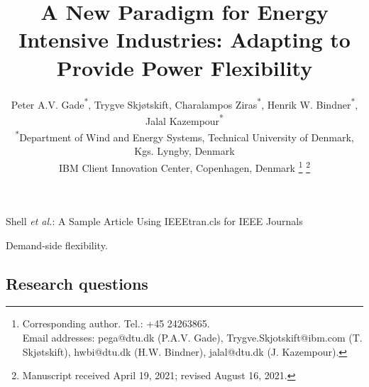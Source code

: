 \documentclass[lettersize,journal]{IEEEtran}
\begin{document}
\title{A New Paradigm for Energy Intensive Industries: Adapting to Provide Power Flexibility}

\author{Peter A.V. Gade\textsuperscript{*}\textsuperscript{\textdagger}, Trygve Skjøtskift\textsuperscript{\textdagger}, Charalampos Ziras\textsuperscript{*}, Henrik W. Bindner\textsuperscript{*}, Jalal Kazempour\textsuperscript{*} \\
    \textsuperscript{*}Department of Wind and Energy Systems, Technical University of Denmark, Kgs. Lyngby, Denmark \\
    \textsuperscript{\textdagger}IBM Client Innovation Center, Copenhagen, Denmark
    \thanks{Corresponding author. Tel.: +45 24263865. \\ Email addresses: pega@dtu.dk (P.A.V. Gade), Trygve.Skjotskift@ibm.com (T. Skjøtskift), hwbi@dtu.dk (H.W. Bindner), jalal@dtu.dk (J. Kazempour).}%
    \thanks{Manuscript received April 19, 2021; revised August 16, 2021.}}


%
{Shell \MakeLowercase{\textit{et al.}}: A Sample Article Using IEEEtran.cls for IEEE Journals}


\maketitle


\begin{abstract}
    
\end{abstract}

\begin{IEEEkeywords}
    Demand-side flexibility.
\end{IEEEkeywords}



\subsection{Research questions}
\end{document}
